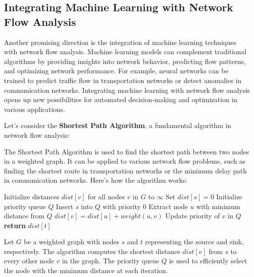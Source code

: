 \documentclass[12pt]{book} %
\begin{document}
\subsection{Integrating Machine Learning with Network Flow Analysis}
Another promising direction is the integration of machine learning techniques with network flow analysis. Machine learning models can complement traditional algorithms by providing insights into network behavior, predicting flow patterns, and optimizing network performance. For example, neural networks can be trained to predict traffic flow in transportation networks or detect anomalies in communication networks. Integrating machine learning with network flow analysis opens up new possibilities for automated decision-making and optimization in various applications.

Let's consider the \textbf{Shortest Path Algorithm}, a fundamental algorithm in network flow analysis:

The Shortest Path Algorithm is used to find the shortest path between two nodes in a weighted graph. It can be applied to various network flow problems, such as finding the shortest route in transportation networks or the minimum delay path in communication networks. Here's how the algorithm works:
\FloatBarrier
\begin{algorithm}[H]
\caption{Shortest Path Algorithm}
\begin{algorithmic}[1]
    \State Initialize distances $dist[v]$ for all nodes $v$ in $G$ to $\infty$
    \State Set $dist[s] = 0$
    \State Initialize priority queue $Q$
    \State Insert $s$ into $Q$ with priority $0$
        \State Extract node $u$ with minimum distance from $Q$
                \State $dist[v] = dist[u] + weight(u, v)$
                \State Update priority of $v$ in $Q$
            \EndIf
        \EndFor
    \EndWhile
    \State \textbf{return} $dist[t]$
\EndProcedure
\end{algorithmic}
\end{algorithm}
\FloatBarrier
Let \(G\) be a weighted graph with nodes \(s\) and \(t\) representing the source and sink, respectively. The algorithm computes the shortest distance \(dist[v]\) from \(s\) to every other node \(v\) in the graph. The priority queue \(Q\) is used to efficiently select the node with the minimum distance at each iteration.
\end{document}
